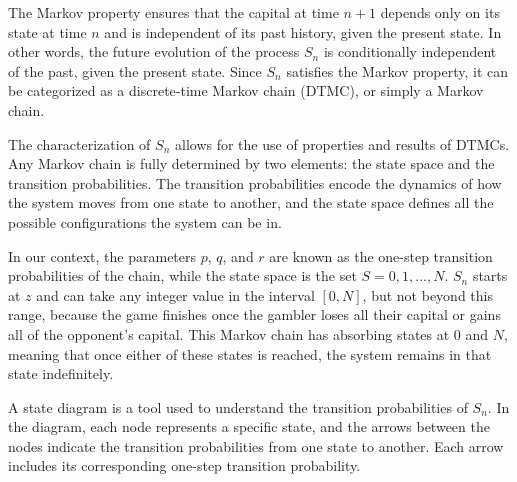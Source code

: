 \documentclass[11pt,twoside]{article}
\numberwithin{Theorem}{section}
\numberwithin{Definition}{section}
\numberwithin{Lemma}{section}
\numberwithin{Algorithm}{section}
\numberwithin{equation}{section}
\begin{document}
The Markov property ensures that the capital at time $n+1$ depends only on its state at time $n$ and is independent of its past history, given the present state. In other words, the future evolution of the process $S_{n}$ is conditionally independent of the past, given the present state. Since $S_{n}$ satisfies the Markov property, it can be categorized as a discrete-time Markov chain (DTMC), or simply a Markov chain.

The characterization of $S_{n}$ allows for the use of properties and results of DTMCs. Any Markov chain is fully determined by two elements: the state space and the transition probabilities. The transition probabilities encode the dynamics of how the system moves from one state to another, and the state space defines all the possible configurations the system can be in.

In our context, the parameters $p$, $q$, and $r$ are known as the one-step transition probabilities of the chain, while the state space is the set $S = {0, 1, ..., N }$. $S_{n}$ starts at $z$ and can take any integer value in the interval $[0, N]$, but not beyond this range, because the game finishes once the gambler loses all their capital or gains all of the opponent's capital. This Markov chain has absorbing states at $0$ and $N$, meaning that once either of these states is reached, the system remains in that state indefinitely.

A state diagram is a tool used to understand the transition probabilities of $S_{n}$. In the diagram, each node represents a specific state, and the arrows between the nodes indicate the transition probabilities from one state to another. Each arrow includes its corresponding one-step transition probability.
\end{document}
